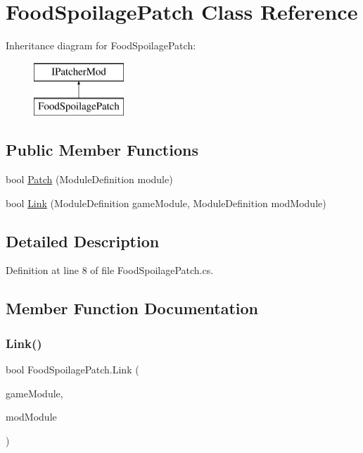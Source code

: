 \hypertarget{class_food_spoilage_patch}{}\section{Food\+Spoilage\+Patch Class Reference}
\label{class_food_spoilage_patch}
Inheritance diagram for Food\+Spoilage\+Patch\+:\begin{figure}[H]
\begin{center}
\leavevmode
\includegraphics[height=2.000000cm]{class_food_spoilage_patch}
\end{center}
\end{figure}
\subsection*{Public Member Functions}
\begin{DoxyCompactItemize}
\item 
bool \mbox{\hyperlink{class_food_spoilage_patch_a68168b94551e581dc9e44fe4c0f5354c}{Patch}} (Module\+Definition module)
\item 
bool \mbox{\hyperlink{class_food_spoilage_patch_a4ffacf1f1626d104d194894b8c3d8714}{Link}} (Module\+Definition game\+Module, Module\+Definition mod\+Module)
\end{DoxyCompactItemize}


\subsection{Detailed Description}


Definition at line 8 of file Food\+Spoilage\+Patch.\+cs.



\subsection{Member Function Documentation}
\mbox{\label{class_food_spoilage_patch_a4ffacf1f1626d104d194894b8c3d8714}} 
\subsubsection{\texorpdfstring{Link()}{Link()}}
{\footnotesize\ttfamily bool Food\+Spoilage\+Patch.\+Link (\begin{DoxyParamCaption}\item[{Module\+Definition}]{game\+Module,  }\item[{Module\+Definition}]{mod\+Module }\end{DoxyParamCaption})}



